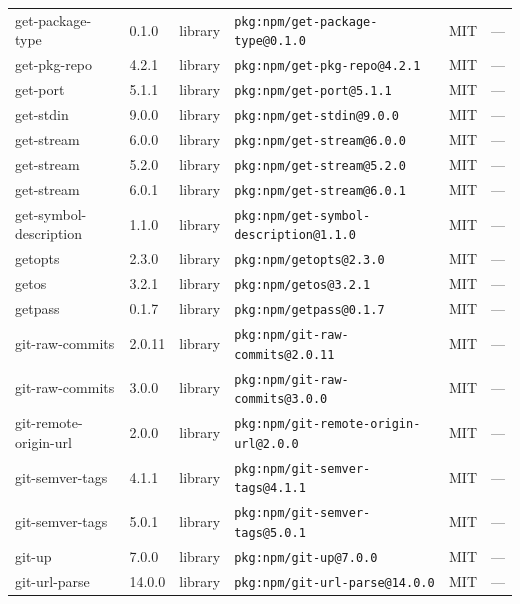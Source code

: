 \documentclass[11pt,a4paper]{article}
\begin{document}
\begin{longtable}{|p{4cm}|p{2cm}|p{1.6cm}|p{5cm}|p{1.5cm}|p{3.5cm}|}
\raggedright get-package-type & 0.1.0 & library & \small\texttt{pkg:npm/get-package-type@0.1.0} & MIT & \small — \\
\raggedright get-pkg-repo & 4.2.1 & library & \small\texttt{pkg:npm/get-pkg-repo@4.2.1} & MIT & \small — \\
\raggedright get-port & 5.1.1 & library & \small\texttt{pkg:npm/get-port@5.1.1} & MIT & \small — \\
\raggedright get-stdin & 9.0.0 & library & \small\texttt{pkg:npm/get-stdin@9.0.0} & MIT & \small — \\
\raggedright get-stream & 6.0.0 & library & \small\texttt{pkg:npm/get-stream@6.0.0} & MIT & \small — \\
\raggedright get-stream & 5.2.0 & library & \small\texttt{pkg:npm/get-stream@5.2.0} & MIT & \small — \\
\raggedright get-stream & 6.0.1 & library & \small\texttt{pkg:npm/get-stream@6.0.1} & MIT & \small — \\
\raggedright get-symbol-description & 1.1.0 & library & \small\texttt{pkg:npm/get-symbol-description@1.1.0} & MIT & \small — \\
\raggedright getopts & 2.3.0 & library & \small\texttt{pkg:npm/getopts@2.3.0} & MIT & \small — \\
\raggedright getos & 3.2.1 & library & \small\texttt{pkg:npm/getos@3.2.1} & MIT & \small — \\
\raggedright getpass & 0.1.7 & library & \small\texttt{pkg:npm/getpass@0.1.7} & MIT & \small — \\
\raggedright git-raw-commits & 2.0.11 & library & \small\texttt{pkg:npm/git-raw-commits@2.0.11} & MIT & \small — \\
\raggedright git-raw-commits & 3.0.0 & library & \small\texttt{pkg:npm/git-raw-commits@3.0.0} & MIT & \small — \\
\raggedright git-remote-origin-url & 2.0.0 & library & \small\texttt{pkg:npm/git-remote-origin-url@2.0.0} & MIT & \small — \\
\raggedright git-semver-tags & 4.1.1 & library & \small\texttt{pkg:npm/git-semver-tags@4.1.1} & MIT & \small — \\
\raggedright git-semver-tags & 5.0.1 & library & \small\texttt{pkg:npm/git-semver-tags@5.0.1} & MIT & \small — \\
\raggedright git-up & 7.0.0 & library & \small\texttt{pkg:npm/git-up@7.0.0} & MIT & \small — \\
\raggedright git-url-parse & 14.0.0 & library & \small\texttt{pkg:npm/git-url-parse@14.0.0} & MIT & \small — \\

\end{longtable}
\end{document}

